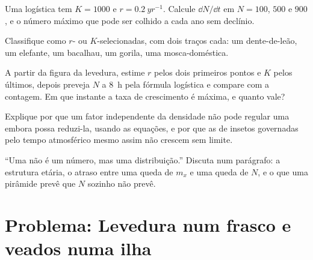 \begin{exercise}[$\star\star$]\label{exo:b1:populations:8}
Uma  logística tem $K = 1000$ e $r = \qty{0.2}{yr^{-1}}$.
Calcule $\dd N/\dd t$ em $N = 100$, $500$ e $900$, e o número máximo
que pode ser colhido a cada ano sem declínio.
\end{exercise}

\begin{exercise}[$\star\star$]\label{exo:b1:populations:9}
Classifique como $r$- ou $K$-selecionadas, com dois traços cada: um
dente-de-leão, um elefante, um bacalhau, um gorila, uma mosca-doméstica.
\end{exercise}

\begin{exercise}[$\star\star\star$]\label{exo:b1:populations:10}
A partir da figura da levedura, estime $r$ pelos dois primeiros pontos
e $K$ pelos últimos, depois preveja $N$ a \qty{8}{h} pela fórmula
logística e compare com a contagem. Em que instante a taxa de
crescimento é máxima, e quanto vale?
\end{exercise}

\begin{exercise}[$\star\star\star$]\label{exo:b1:populations:11}
Explique por que um fator independente da densidade não pode regular
uma  embora possa reduzi-la, usando as equações, e por que as
 de insetos governadas pelo tempo atmosférico mesmo assim
não crescem sem limite.
\end{exercise}

\begin{exercise}[$\star\star\star$]\label{exo:b1:populations:12}
``Uma  não é um número, mas uma distribuição.'' Discuta num
parágrafo: a estrutura etária, o atraso entre uma queda de $m_x$ e uma
queda de $N$, e o que uma pirâmide prevê que $N$ sozinho não prevê.
\end{exercise}

\section{Problema: Levedura num frasco e veados numa ilha}

